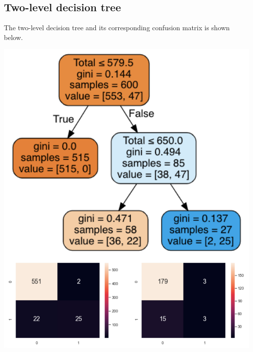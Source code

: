 \documentclass[11pt]{article}
\begin{document}
 \newpage
\subsection{Two-level decision tree}
\label{sec:org4f82f87}
The two-level decision tree and its corresponding confusion matrix is shown below.
\begin{center}
\includegraphics[width=.9\linewidth]{./images/binary-classification-two-level-decision-tree.png}
\end{center}

 \newpage
\end{document}
